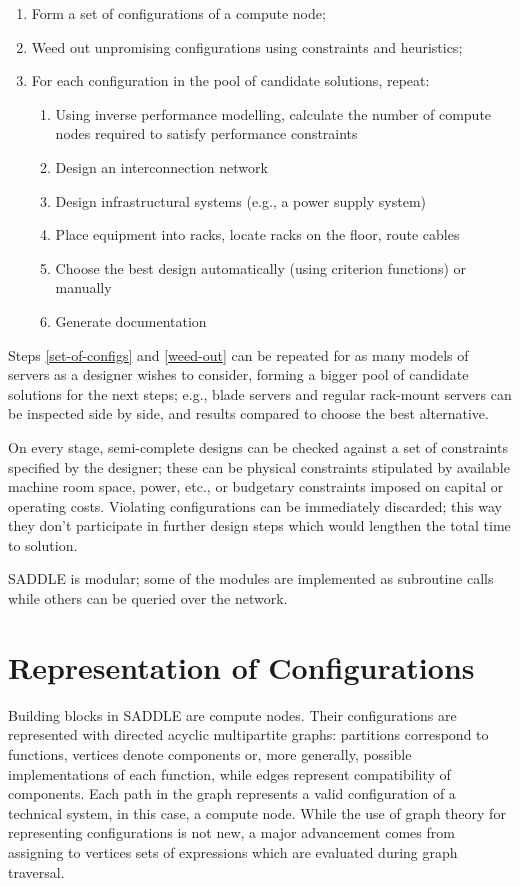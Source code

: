 \documentclass[runningheads,a4paper]{llncs}
\begin{document}
\begin{enumerate}
\item \label{set-of-configs} Form a set of configurations of a compute node;
\item \label{weed-out} Weed out unpromising configurations using constraints and heuristics;
\item For each configuration in the pool of candidate solutions, repeat:
	\begin{enumerate}
	\item Using inverse performance modelling, calculate the number of compute nodes required to satisfy performance constraints
	\item Design an interconnection network
	\item Design infrastructural systems (e.g., a power supply system)
	\item Place equipment into racks, locate racks on the floor, route cables
	\item Choose the best design automatically (using criterion functions) or manually
	\item Generate documentation
	\end{enumerate}
\end{enumerate}

Steps \ref{set-of-configs} and \ref{weed-out} can be repeated for as many models of servers as a designer wishes to consider, forming a bigger pool of candidate solutions for the next steps; e.g., blade servers and regular rack-mount servers can be inspected side by side, and results compared to choose the best alternative.

On every stage, semi-complete designs can be checked against a set of constraints specified by the designer; these can be physical constraints stipulated by available machine room space, power, etc., or budgetary constraints imposed on capital or operating costs. Violating configurations can be immediately discarded; this way they don't participate in further design steps which would lengthen the total time to solution.

SADDLE is modular; some of the modules are implemented as subroutine calls while others can be queried over the network.


\section{Representation of Configurations}
\label{section:Representation-of-Configurations}

Building blocks in SADDLE are compute nodes. Their configurations are represented with directed acyclic multipartite graphs: partitions correspond to functions, vertices denote components or, more generally, possible implementations of each function, while edges represent compatibility of components. Each path in the graph represents a valid configuration of a technical system, in this case, a compute node. While the use of graph theory for representing configurations is not new, a major advancement comes from assigning to vertices sets of expressions which are evaluated during graph traversal.
\end{document}
